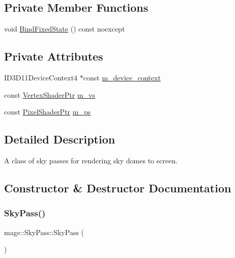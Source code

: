 \subsection*{Private Member Functions}
\begin{DoxyCompactItemize}
\item 
void \hyperlink{classmage_1_1_sky_pass_aa74c5e32a917aac610b2c7e4750c4639}{Bind\+Fixed\+State} () const noexcept
\end{DoxyCompactItemize}
\subsection*{Private Attributes}
\begin{DoxyCompactItemize}
\item 
I\+D3\+D11\+Device\+Context4 $\ast$const \hyperlink{classmage_1_1_sky_pass_aaa4d6a7c12dbad7938433f2d32107f27}{m\+\_\+device\+\_\+context}
\item 
const \hyperlink{namespacemage_a1f19b094f771e30bc0a6c1cebcc0dd58}{Vertex\+Shader\+Ptr} \hyperlink{classmage_1_1_sky_pass_abe56d3bff2f38f8959e9b5f4c00a69ff}{m\+\_\+vs}
\item 
const \hyperlink{namespacemage_acbec875bb5e5e085e32ed244a24d2b6f}{Pixel\+Shader\+Ptr} \hyperlink{classmage_1_1_sky_pass_a9f975229c5a37d28a728117c1fb64ab8}{m\+\_\+ps}
\end{DoxyCompactItemize}


\subsection{Detailed Description}
A class of sky passes for rendering sky domes to screen. 

\subsection{Constructor \& Destructor Documentation}
\hypertarget{classmage_1_1_sky_pass_a41bb9d2d37f2c3a7bc5b12cffad9dafa}{}\label{classmage_1_1_sky_pass_a41bb9d2d37f2c3a7bc5b12cffad9dafa} 
\subsubsection{\texorpdfstring{Sky\+Pass()}{SkyPass()}\hspace{0.1cm}{\footnotesize\ttfamily [1/3]}}
{\footnotesize\ttfamily mage\+::\+Sky\+Pass\+::\+Sky\+Pass (\begin{DoxyParamCaption}{ }\end{DoxyParamCaption})}

